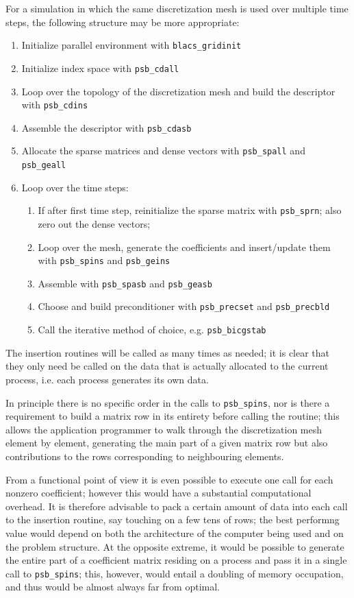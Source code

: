 For a simulation in which the same discretization mesh is used over
multiple time steps, the following structure may be more appropriate:
\begin{enumerate}
\item Initialize parallel environment with \verb|blacs_gridinit|
\item Initialize index space with \verb|psb_cdall|
\item Loop over the topology of the discretization mesh and build the
  descriptor with \verb|psb_cdins|
\item Assemble the descriptor with \verb|psb_cdasb|
\item Allocate the sparse matrices and dense vectors with
  \verb|psb_spall| and \verb|psb_geall|
\item Loop over the time steps: 
\begin{enumerate}
\item If after first time step, 
  reinitialize the sparse matrix with \verb|psb_sprn|; also zero out
  the dense vectors;
\item Loop over the mesh, generate the coefficients and insert/update
  them with \verb|psb_spins| and \verb|psb_geins|
\item Assemble with \verb|psb_spasb| and \verb|psb_geasb|
\item Choose and build preconditioner with \verb|psb_precset| and
  \verb|psb_precbld|
\item Call the iterative method of choice, e.g. \verb|psb_bicgstab|
 \end{enumerate}
\end{enumerate}
The insertion routines will be called as many times as needed; it is
clear that they only need be called on the data that is actually
allocated to the current process, i.e. each process generates its own
data. 

In principle there is no specific order in the calls to
\verb|psb_spins|, nor is there a requirement to build a matrix row in
its entirety before calling the routine; this allows the application
programmer to walk through the discretization mesh element by element,
generating the main part of a given matrix row but also contributions
to the rows corresponding to neighbouring elements. 

From a functional point of view it is even possible to execute one
call for each nonzero coefficient; however this would have a
substantial computational overhead. It is therefore advisable to pack
a certain amount of data into each call to the insertion routine, say
touching on a few tens of rows; the best performng value would depend
on both the architecture of the computer being used and on the problem
structure. 
At the opposite extreme, it would be possible to generate the entire
part of a coefficient matrix residing on a process and pass it in a
single call to \verb|psb_spins|; this, however, would entail a
doubling of memory occupation, and thus would be almost always far
from optimal. 

